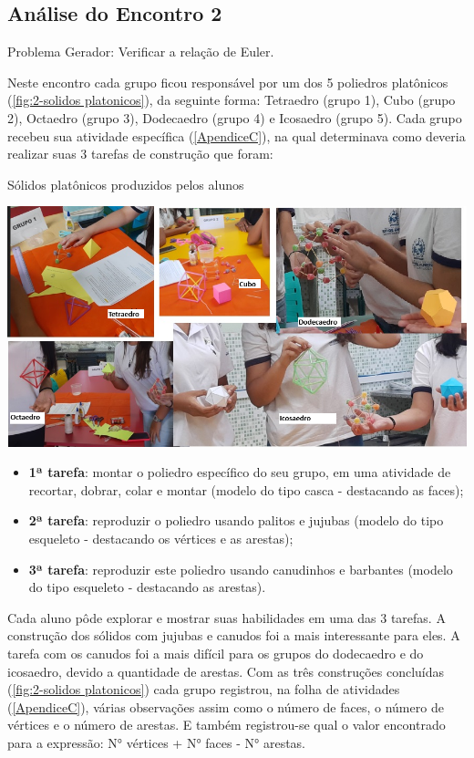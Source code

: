 \subsection{Análise do Encontro 2}

Problema Gerador: Verificar a relação de Euler.

Neste encontro cada grupo ficou responsável por um dos 5 poliedros platônicos (\autoref{fig:2-solidos platonicos}), da seguinte forma:  Tetraedro (grupo 1), Cubo (grupo 2), Octaedro (grupo 3), Dodecaedro  (grupo 4) e Icosaedro (grupo 5). Cada grupo recebeu sua atividade específica (\autoref{ApendiceC}), na qual determinava como deveria realizar suas 3 tarefas de construção que foram:

\begin{CenteredFigure}
    \caption{Sólidos platônicos produzidos pelos alunos} \label{fig:2-solidos platonicos}
    \includegraphics[width=\linewidth]{Imagens/Novas imagens/Sólidos Platônicos compilado}
    \legend{\autoria}
\end{CenteredFigure}

\begin{itemize}
    \item \textbf{1ª tarefa}:  montar o poliedro específico do seu grupo, em uma atividade de recortar, dobrar, colar e montar (modelo do tipo casca - destacando as faces);
    \item \textbf{2ª tarefa}: reproduzir o poliedro usando palitos e jujubas (modelo do tipo esqueleto - destacando os  vértices e as arestas);
    \item \textbf{3ª tarefa}: reproduzir este poliedro usando canudinhos e barbantes (modelo do tipo esqueleto - destacando as arestas).
\end{itemize}

Cada aluno pôde explorar e mostrar suas habilidades em uma das 3 tarefas. A construção dos sólidos com jujubas e canudos foi a mais interessante para eles. A tarefa com os canudos foi a mais difícil para os grupos do dodecaedro e do icosaedro, devido a quantidade de arestas. Com as três construções concluídas (\autoref{fig:2-solidos platonicos}) cada grupo registrou, na folha de atividades (\autoref{ApendiceC}), várias observações assim como o número de faces, o número de vértices e o número de arestas. E também registrou-se qual o valor encontrado para a expressão: N° vértices + N° faces - N° arestas.

